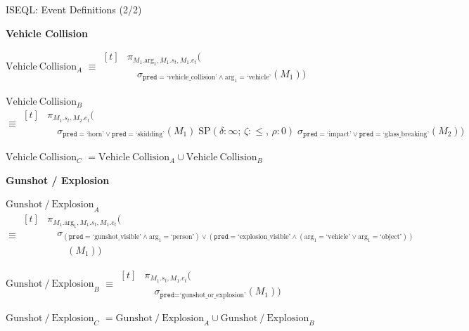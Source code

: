 \documentclass[aspectratio=169,10pt]{beamer}
\newcommand*{\SP}{\mathrm{SP}}
\begin{document}
\begin{frame}{ISEQL: Event Definitions (2/2)}
\par\vspace{0.05em}
\noindent\textbf{Vehicle Collision}\par\vspace{0.9pt}
\noindent$\mathrm{Vehicle\ Collision}_A$ $\equiv \begin{aligned}[t]
&\pi_{M_1.\mathrm{arg}_1, M_1.s_t, M_1.e_t} ( \\
&\quad \sigma_{\texttt{pred}=\text{`vehicle\_collision'} \land \mathrm{arg}_1=\text{`vehicle'}}(M_1) )
\end{aligned}$\par\vspace{0.9pt}
\noindent$\mathrm{Vehicle\ Collision}_B$ $\equiv \begin{aligned}[t]
&\pi_{M_1.s_t, M_2.e_t} ( \\
    &\quad \sigma_{\texttt{pred}=\text{`horn'} \lor \texttt{pred}=\text{`skidding'}}(M_1) \;\SP(\delta:\infty;\,\zeta:\le,\,\rho:0)\; \sigma_{\texttt{pred}=\text{`impact'} \lor \texttt{pred}=\text{`glass\_breaking'}}(M_2) )
\end{aligned}$\par\vspace{0.9pt}
\noindent$\mathrm{Vehicle\ Collision}_C$ $= \mathrm{Vehicle\ Collision}_A \cup \mathrm{Vehicle\ Collision}_B$\par\vspace{0.9pt}

\par\vspace{0.05em}
\noindent\textbf{Gunshot / Explosion}\par\vspace{0.9pt}
\noindent$\mathrm{Gunshot\ /\ Explosion}_A$ $\equiv \begin{aligned}[t]
&\pi_{M_1.\mathrm{arg}_1, M_1.s_t, M_1.e_t} ( \\
&\quad \sigma_{( \texttt{pred}=\text{`gunshot\_visible'} \land \mathrm{arg}_1=\text{`person'} ) \lor ( \texttt{pred}=\text{`explosion\_visible'} \land ( \mathrm{arg}_1=\text{`vehicle'} \lor \mathrm{arg}_1=\text{`object'} ) )} \\
&\qquad (M_1) )
\end{aligned}$\par\vspace{0.9pt}
\noindent$\mathrm{Gunshot\ /\ Explosion}_B$ $\equiv \begin{aligned}[t]
&\pi_{M_1.s_t, M_1.e_t} ( \\
&\quad \sigma_{\texttt{pred}=\text{`gunshot\_or\_explosion'}}(M_1) )
\end{aligned}$\par\vspace{0.9pt}
\noindent$\mathrm{Gunshot\ /\ Explosion}_C$ $= \mathrm{Gunshot\ /\ Explosion}_A \cup \mathrm{Gunshot\ /\ Explosion}_B$
\end{frame}
\end{document}
